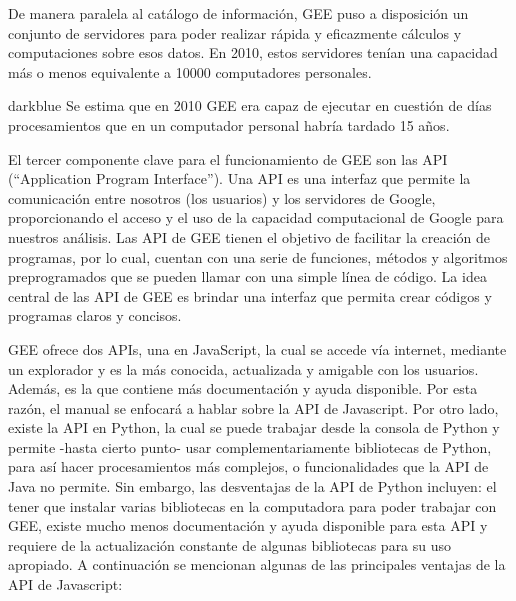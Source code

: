 \documentclass[
  12pt,
  letterpaper,
  twoside]{book}
\begin{document}
De manera paralela al catálogo de información, GEE puso a disposición un conjunto de servidores para poder realizar rápida y eficazmente cálculos y computaciones sobre esos datos. En 2010, estos servidores tenían una capacidad más o menos equivalente a 10000 computadores personales.

\begin{bluebox2}

\begin{awesomeblock}{5pt}{\faLightbulb}{darkblue}
Se estima que en 2010 GEE era capaz de ejecutar en cuestión de días procesamientos que en un computador personal habría tardado 15 años.

\end{awesomeblock}

\end{bluebox2}

El tercer componente clave para el funcionamiento de GEE son las API (``Application Program Interface''). Una API es una interfaz que permite la comunicación entre nosotros (los usuarios) y los servidores de Google, proporcionando el acceso y el uso de la capacidad computacional de Google para nuestros análisis. Las API de GEE tienen el objetivo de facilitar la creación de programas, por lo cual, cuentan con una serie de funciones, métodos y algoritmos preprogramados que se pueden llamar con una simple línea de código. La idea central de las API de GEE es brindar una interfaz que permita crear códigos y programas claros y concisos.

GEE ofrece dos APIs, una en JavaScript, la cual se accede vía internet, mediante un explorador y es la más conocida, actualizada y amigable con los usuarios. Además, es la que contiene más documentación y ayuda disponible. Por esta razón, el manual se enfocará a hablar sobre la API de Javascript. Por otro lado, existe la API en Python, la cual se puede trabajar desde la consola de Python y permite -hasta cierto punto- usar complementariamente bibliotecas de Python, para así hacer procesamientos más complejos, o funcionalidades que la API de Java no permite. Sin embargo, las desventajas de la API de Python incluyen: el tener que instalar varias bibliotecas en la computadora para poder trabajar con GEE, existe mucho menos documentación y ayuda disponible para esta API y requiere de la actualización constante de algunas bibliotecas para su uso apropiado. A continuación se mencionan algunas de las principales ventajas de la API de Javascript:
\end{document}
